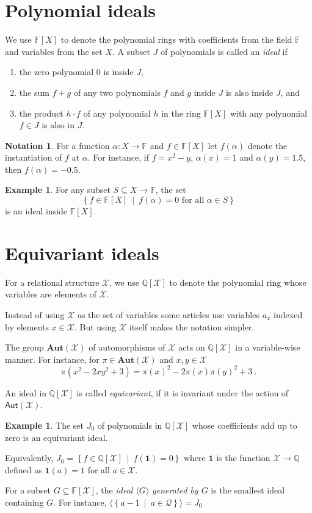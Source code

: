 \documentclass[12pt,a4paper,article]{memoir}
\newcommand{\struct}{\mathcal{X}}
\newcommand{\dloQ}{\mathcal{Q}}
\newcommand{\Q}{\mathbb{Q}}
\newcommand{\F}{\mathbb{F}}
\newcommand{\aut}[1]{\mathsf{Aut}\left(#1\right)}
\newcommand{\poly}[2]{#1[#2]}
\newcommand{\setof}[2]{\left\{#1\ \mid\ #2 \right\}}
\newcommand{\idGen}[1]{\langle#1\rangle}
\newcommand{\emphdef}[1]{\emph{\textcolor{BrickRed}{#1}}}
\theoremstyle{definition}
\newtheorem{example}[theorem]{Example}
\newtheorem{notation}[theorem]{Notation}
\begin{document}
\section{Polynomial ideals}
%
We use $\poly{\F}{X}$ to denote the polynomial rings with coefficients from the field $\F$ and variables from the set $X$.
A subset $J$ of polynomials is called an \emphdef{ideal} if
\begin{enumerate}
\item the zero polynomial $0$ is inside $J$,
\item the sum $f + g$ of any two polynomials $f$ and $g$ inside $J$ is also inside $J$, and
\item the product $h\cdot f$ of any polynomial $h$ in the ring $\poly{\F}{X}$ with any polynomial $f\in J$ is also in $J$.
\end{enumerate}
%
\begin{notation}
For a function $\alpha : X\to \F$ and $f\in\poly{\F}{X}$ let $f(\alpha)$ denote the instantiation of $f$ at $\alpha$.
For instance, if $f = x^2 - y$, $\alpha(x) = 1$ and $\alpha(y) = 1.5$,
then $f(\alpha) = -0.5$.
\end{notation}
%
\begin{example}
For any subset $S\subseteq X\to \F$,
the set
\[
\setof{f\in\poly{\F}{X}}{f(\alpha) = 0\text{ for all }\alpha\in S}
\]
is an ideal inside $\poly{\F}{X}$.
\end{example}
%
\section{Equivariant ideals}
%
For a relational structure $\struct$,
we use $\mathbb{Q}[\struct]$ to denote the polynomial ring whose variables are elements of $\struct$.

Instead of using $\struct$ as the set of variables some articles use variables $a_{x}$ indexed by elements $x\in\struct$.
But using $\struct$ itself makes the notation simpler.

The group $\mathbf{Aut}(\struct)$ of automorphisms of $\struct$ acts on $\mathbb{Q}[\struct]$ in a variable-wise manner.
For instance, for $\pi\in\mathbf{Aut}(\struct)$ and $x,y\in\struct$
$$\pi(x^2 - 2xy^2 + 3) =
\pi(x)^2 - 2\pi(x)\pi(y)^2 + 3\ .$$

An ideal in $\poly{\Q}{\struct}$ is called \emphdef{equivariant},
if it is invariant under the action of $\aut{\struct}$.
%
\begin{example}
The set $J_0$ of polynomials in $\poly{\Q}{\struct}$ whose coefficients add up to zero is an equivariant ideal.

Equivalently, $J_0 = \setof{f\in\poly{\Q}{\struct}}{f(\mathbf{1}) = 0}$ where $\mathbf{1}$ is the function $\struct\to\Q$ defined as $\mathbf{1}(a) = 1$ for all $a\in\struct$.
\end{example}
%
For a subset $G\subseteq\poly{\F}{\struct}$,
the \emphdef{ideal $\idGen{G}$ generated by $G$} is the smallest ideal containing $G$.
For instance, $\idGen{\setof{a - 1}{a\in\dloQ}} = J_0$
\end{document}
